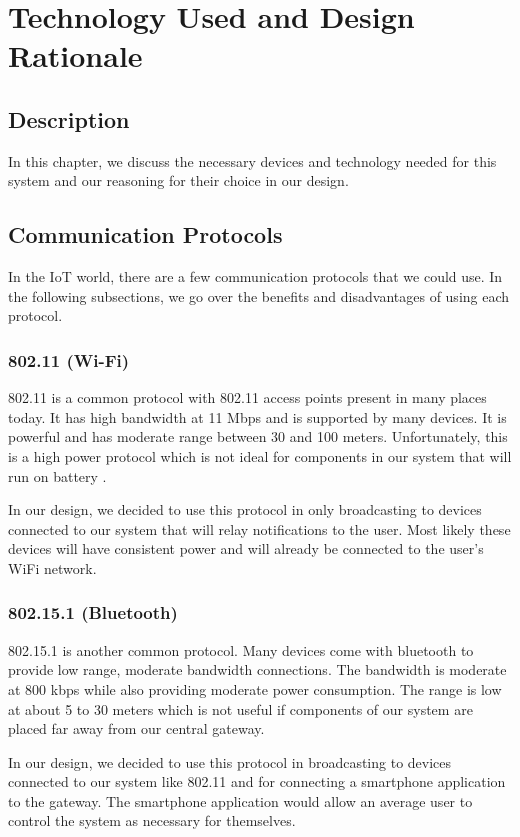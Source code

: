 \chapter{Technology Used and Design Rationale}

\section{Description}
In this chapter, we discuss the necessary devices and technology needed for this system and our reasoning for their choice in our design.

\section{Communication Protocols}
In the IoT world, there are a few communication protocols that we could use. In the following subsections, we go over the benefits and disadvantages of using each protocol.

\subsection{802.11 (Wi-Fi)}
802.11 is a common protocol with 802.11 access points present in many places today. It has high bandwidth at 11 Mbps and is supported by many devices. It is powerful and has moderate range between 30 and 100 meters. Unfortunately, this is a high power protocol which is not ideal for components in our system that will run on battery \cite{website:bluetooth-vs-wifi}.

    In our design, we decided to use this protocol in only broadcasting to devices connected to our system that will relay notifications to the user. Most likely these devices will have consistent power and will already be connected to the user’s WiFi network.

\subsection{802.15.1 (Bluetooth)}
802.15.1 is another common protocol. Many devices come with bluetooth to provide low range, moderate bandwidth connections. The bandwidth is moderate at 800 kbps while also providing moderate power consumption. The range is low at about 5 to 30 meters which is not useful if components of our system are placed far away from our central gateway. 

    In our design, we decided to use this protocol in broadcasting to devices connected to our system like 802.11 and for connecting a smartphone application to the gateway. The smartphone application would allow an average user to control the system as necessary for themselves.

